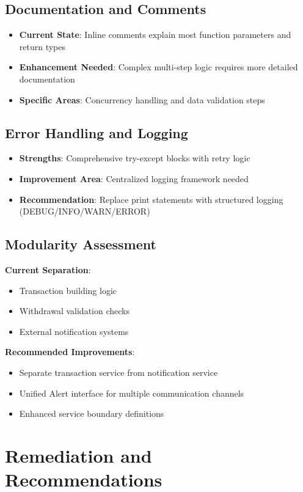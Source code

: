 \documentclass[11pt,a4paper]{article}
\begin{document}
\subsection{Documentation and Comments}
\begin{itemize}
    \item \textbf{Current State}: Inline comments explain most function parameters and return types
    \item \textbf{Enhancement Needed}: Complex multi-step logic requires more detailed documentation
    \item \textbf{Specific Areas}: Concurrency handling and data validation steps
\end{itemize}

\subsection{Error Handling and Logging}
\begin{itemize}
    \item \textbf{Strengths}: Comprehensive try-except blocks with retry logic
    \item \textbf{Improvement Area}: Centralized logging framework needed
    \item \textbf{Recommendation}: Replace print statements with structured logging (DEBUG/INFO/WARN/ERROR)
\end{itemize}

\subsection{Modularity Assessment}
\textbf{Current Separation}:
\begin{itemize}
    \item Transaction building logic
    \item Withdrawal validation checks
    \item External notification systems
\end{itemize}

\textbf{Recommended Improvements}:
\begin{itemize}
    \item Separate transaction service from notification service
    \item Unified Alert interface for multiple communication channels
    \item Enhanced service boundary definitions
\end{itemize}

\section{Remediation and Recommendations}
\end{document}
